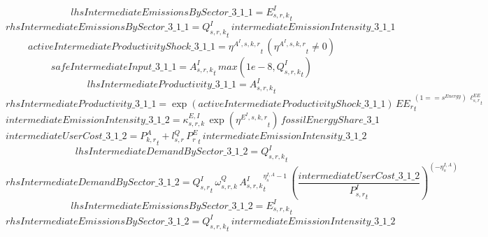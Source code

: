 \begin{dmath*}
lhsIntermediateEmissionsBySector\_3\_1\_1 = {{E^I_{s,r,k}}}_{t}
\end{dmath*}
\begin{dmath*}
rhsIntermediateEmissionsBySector\_3\_1\_1 = {{Q^{I}_{s,r,k}}}_{t}\, {intermediateEmissionIntensity\_3\_1\_1}
\end{dmath*}
\begin{dmath*}
activeIntermediateProductivityShock\_3\_1\_1 = {{\eta^{A^{I},s,k,r}}}_{t}\, \left({{\eta^{A^{I},s,k,r}}}_{t}\neq 0\right)
\end{dmath*}
\begin{dmath*}
safeIntermediateInput\_3\_1\_1 = {{A^{I}_{s,r,k}}}_{t}\, max(1e-8,{{Q^{I}_{s,r,k}}}_{t})
\end{dmath*}
\begin{dmath*}
lhsIntermediateProductivity\_3\_1\_1 = {{A^{I}_{s,r,k}}}_{t}
\end{dmath*}
\begin{dmath*}
rhsIntermediateProductivity\_3\_1\_1 = \exp\left({activeIntermediateProductivityShock\_3\_1\_1}\right)\, {{EE_r}}_{t}^{\left(1=={{s^{Energy}}}\right)\, {{\ell^{EE}_{s,r}}}_{t}}
\end{dmath*}
\begin{dmath*}
intermediateEmissionIntensity\_3\_1\_2 = {{\kappa^{E,I}_{s,r,k}}}\, \exp\left({{\eta^{E^{I},s,k,r}}}_{t}\right)\, {fossilEnergyShare\_3\_1}
\end{dmath*}
\begin{dmath*}
intermediateUserCost\_3\_1\_2 = {{P^{A}_{k,r}}}_{t}+{{l^{Q}_{s,r}}}\, {{P^E_r}}_{t}\, {intermediateEmissionIntensity\_3\_1\_2}
\end{dmath*}
\begin{dmath*}
lhsIntermediateDemandBySector\_3\_1\_2 = {{Q^{I}_{s,r,k}}}_{t}
\end{dmath*}
\begin{dmath*}
rhsIntermediateDemandBySector\_3\_1\_2 = {{Q^{I}_{s,r}}}_{t}\, {{\omega^{Q}_{s,r,k}}}\, {{A^{I}_{s,r,k}}}_{t}^{{{\eta^{I,A}_{s}}}-1}\, \left(\frac{{intermediateUserCost\_3\_1\_2}}{{{P^{I}_{s,r}}}_{t}}\right)^{\left(-{{\eta^{I,A}_{s}}}\right)}
\end{dmath*}
\begin{dmath*}
lhsIntermediateEmissionsBySector\_3\_1\_2 = {{E^I_{s,r,k}}}_{t}
\end{dmath*}
\begin{dmath*}
rhsIntermediateEmissionsBySector\_3\_1\_2 = {{Q^{I}_{s,r,k}}}_{t}\, {intermediateEmissionIntensity\_3\_1\_2}
\end{dmath*}
